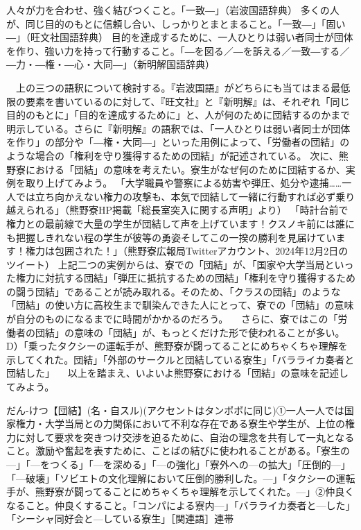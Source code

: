 人々が力を合わせ、強く結びつくこと。「一致―」（岩波国語辞典）
多くの人が、同じ目的のもとに信頼し合い、しっかりとまとまること。「一致―」「固い―」（旺文社国語辞典）
目的を達成するために、一人ひとりは弱い者同士が団体を作り、強い力を持って行動すること。「―を図る／―を訴える／一致―する／―力・―権・―心・大同―」（新明解国語辞典）
 
　上の三つの語釈について検討する。『岩波国語』がどちらにも当てはまる最低限の要素を書いているのに対して、『旺文社』と『新明解』は、それぞれ「同じ目的のもとに」「目的を達成するために」と、人が何のために団結するのかまで明示している。さらに『新明解』の語釈では、「一人ひとりは弱い者同士が団体を作り」の部分や「―権・大同―」といった用例によって、「労働者の団結」のような場合の「権利を守り獲得するための団結」が記述されている。
次に、熊野寮における「団結」の意味を考えたい。寮生がなぜ何のために団結するか、実例を取り上げてみよう。
「大学職員や警察による妨害や弾圧、処分や逮捕……一人では立ち向かえない権力の攻撃も、本気で団結して一緒に行動すれば必ず乗り越えられる」（熊野寮HP掲載「総長室突入に関する声明」より）
「時計台前で権力との最前線で大量の学生が団結して声を上げています！クスノキ前には誰にも把握しきれない程の学生が彼等の勇姿そしてこの一揆の勝利を見届けています！権力は包囲された！」（熊野寮広報局Twitterアカウント、2024年12月2日のツイート）
上記二つの実例からは、寮での「団結」が、「国家や大学当局といった権力に対抗する団結」「弾圧に抵抗するための団結」「権利を守り獲得するための闘う団結」であることが読み取れる。そのため、「クラスの団結」のような「団結」の使い方に高校生まで馴染んできた人にとって、寮での「団結」の意味が自分のものになるまでに時間がかかるのだろう。
　さらに、寮ではこの「労働者の団結」の意味の「団結」が、もっとくだけた形で使われることが多い。
D）「乗ったタクシーの運転手が、熊野寮が闘ってることにめちゃくちゃ理解を示してくれた。団結」「外部のサークルと団結している寮生」「バラライカ奏者と団結した」
　以上を踏まえ、いよいよ熊野寮における「団結」の意味を記述してみよう。
 
だん-けつ【団結】(名・自スル)(アクセントはタンポポに同じ)①一人一人では国家権力・大学当局との力関係において不利な存在である寮生や学生が、上位の権力に対して要求を突きつけ交渉を迫るために、自治の理念を共有して一丸となること。激励や奮起を表すために、ことばの結びに使われることがある。「寮生の—」「—をつくる」「—を深める」「—の強化」「寮外への—の拡大」「圧倒的—」「—破壊」「ソビエトの文化理解において圧倒的勝利した。—」「タクシーの運転手が、熊野寮が闘ってることにめちゃくちゃ理解を示してくれた。—」②仲良くなること。仲良くすること。「コンパによる寮内—」「バラライカ奏者と—した」「シーシャ同好会と—している寮生」［関連語］連帯
 
